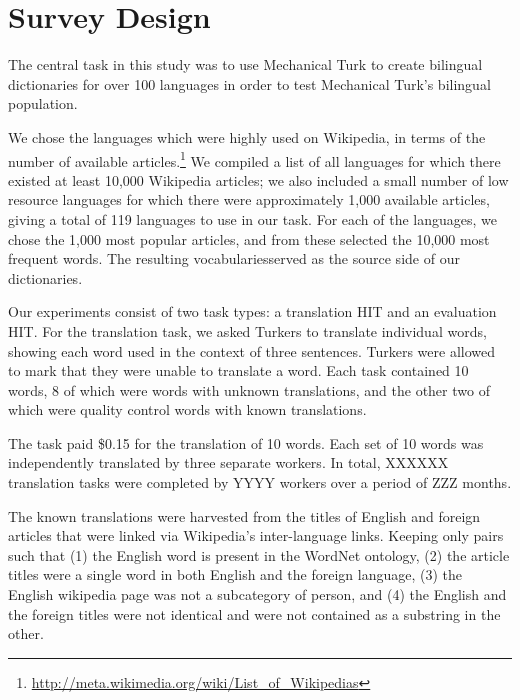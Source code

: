 \documentclass[11pt]{article}
\begin{document}
\section{Survey Design}
The central task in this study was to use Mechanical Turk to create bilingual dictionaries for over 100 languages in order to test Mechanical Turk's bilingual population. 

We chose the languages which were highly used on Wikipedia, in terms of the number of available articles.\footnote{\url{http://meta.wikimedia.org/wiki/List_of_Wikipedias}} We compiled a list of all languages for which there existed at least 10,000 Wikipedia articles; we also included a small number of low resource languages for which there were approximately 1,000 available articles, giving a total of 119 languages to use in our task. For each of the languages, we chose the 1,000 most popular articles, and from these selected the 10,000 most frequent words. The resulting vocabulariesserved as the source side of our dictionaries.

Our experiments consist of two task types: a translation HIT and an evaluation HIT. 
For the translation task, we asked Turkers to translate individual words, showing each word used in the context of three sentences.  Turkers were allowed to mark that they were unable to translate a word. Each task contained 10 words, 8 of which were words with unknown translations, and the other two of which were quality control words with known translations.   

The task paid \$0.15 for the translation of 10 words.  Each set of 10 words was independently translated by three separate workers.  In total, XXXXXX translation tasks were completed by YYYY workers over a period of ZZZ months. 


The known translations were harvested from the titles of English and foreign articles that were linked via Wikipedia's inter-language links.
Keeping only pairs such that (1) the English word is present in the WordNet ontology, (2) the article titles were a single word in both English and the foreign language, (3) the English wikipedia page was not a subcategory of person, and (4) the English and the foreign titles were not identical and were not contained as a substring in the other.
\end{document}
